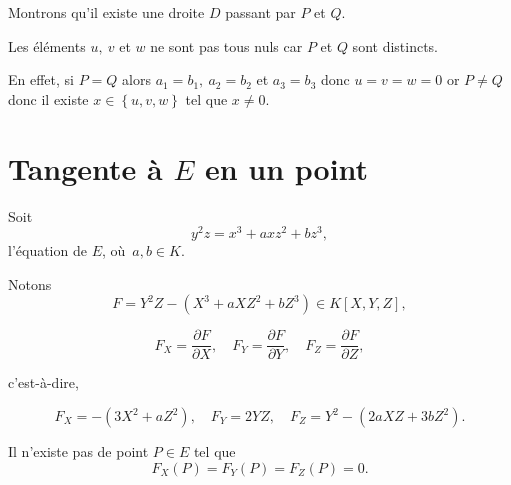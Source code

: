 \begin{demonstration}
    Montrons qu'il existe une droite $D$ passant par $P$ et $Q$.

    Les éléments $u, \ v$ et $w$ ne sont pas tous nuls car $P$ et $Q$ sont distincts.

    En effet, si $P = Q$ alors $a_1 = b_1, \ a_2 = b_2 $ et $a_3 = b_3$ donc $u = v = w =0$ or $P \neq Q$ donc il existe $x \in \left\{ u, v, w \right\}$ tel que $x \neq 0$.
    
\end{demonstration}

\section{Tangente à $E$ en un point}

Soit 
\[
y^2z = x^3 + axz^2 + bz^3
,\] l'équation de $E$, où $a,b \in K$.

Notons
\[
    F = Y^2Z - \left( X^3 + aXZ^2 + bZ^3 \right) \in K[X,Y,Z]
,\] 

\[
F_{X} = \frac{\partial F}{\partial X},\quad F_{Y} = \frac{\partial F}{\partial Y},\quad F_{Z} = \frac{\partial F}{\partial Z}
,\] 

c'est-à-dire, 

\[
F_{X} = - \left( 3X^2 + aZ^2 \right),\quad F_{Y} = 2YZ,\quad F_{Z} = Y^2 - \left( 2aXZ + 3bZ^2 \right)
.\] 

\begin{lemme}
    \label{lem:lemme3}
    
    Il n'existe pas de point $P \in E$ tel que
    \[
    F_{X}(P) = F_{Y}(P) = F_{Z}(P) = 0
    .\] 
\end{lemme}

